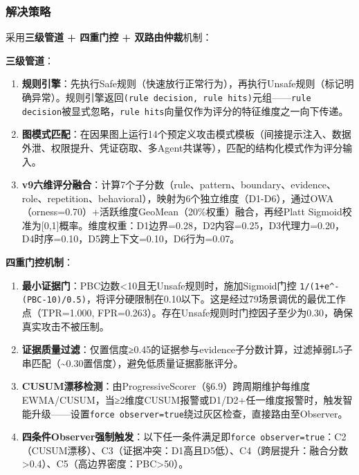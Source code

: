 \documentclass[a4paper]{ctexart}
\makeatletter
\renewcommand{\_}{%
  \ifmmode
    \nfss@text{\textunderscore}%
  \else
    \textunderscore\discretionary{}{}{}%
  \fi}
\makeatother
\begin{document}
\subsubsection{解决策略}



采用\textbf{三级管道 + 四重门控 + 双路由仲裁}机制：


\textbf{三级管道}：


\begin{enumerate}
\item \textbf{规则引擎}：先执行Safe规则（快速放行正常行为），再执行Unsafe规则（标记明确异常）。规则引擎返回\texttt{(rule\_decision, rule\_hits)}元组——\texttt{rule\_decision}被显式忽略，\texttt{rule\_hits}向量仅作为评分的特征维度之一向下传递。
\item \textbf{图模式匹配}：在因果图上运行14个预定义攻击模式模板（间接提示注入、数据外泄、权限提升、凭证窃取、多Agent共谋等），匹配的结构化模式作为评分输入。
\item \textbf{v9六维评分融合}：计算7个子分数（rule、pattern、boundary、evidence、role、repetition、behavioral），映射为6个独立维度（D1-D6），通过OWA（orness=0.70）+活跃维度GeoMean（20\%权重）融合，再经Platt Sigmoid校准为[0,1]概率。维度权重：D1边界=0.28，D2内容=0.25，D3代理力=0.20，D4时序=0.10，D5跨上下文=0.10，D6行为=0.07。
\end{enumerate}

\textbf{四重门控机制}：


\begin{enumerate}
\item \textbf{最小证据门}：PBC边数<10且无Unsafe规则时，施加Sigmoid门控 \texttt{1/(1+e\textasciicircum{}{-(PBC-10)/0.5})}，将评分硬限制在0.10以下。这是经过79场景调优的最优工作点（TPR=1.000, FPR=0.263）。存在Unsafe规则时门控因子至少为0.30，确保真实攻击不被压制。
\item \textbf{证据质量过滤}：仅置信度≥0.45的证据参与evidence子分数计算，过滤掉弱L5子串匹配（\textasciitilde{}0.30置信度），避免低质量证据膨胀评分。
\item \textbf{CUSUM漂移检测}：由ProgressiveScorer（§6.9）跨周期维护每维度EWMA/CUSUM，当≥2维度CUSUM报警或D1/D2+任一维度报警时，触发智能升级——设置\texttt{force\_observer=true}绕过灰区检查，直接路由至Observer。
\item \textbf{四条件Observer强制触发}：以下任一条件满足即\texttt{force\_observer=true}：C2（CUSUM漂移）、C3（证据冲突：D1高且D5低）、C4（跨层提升：融合分数>0.4）、C5（高边界密度：PBC>50）。
\end{enumerate}
\end{document}

